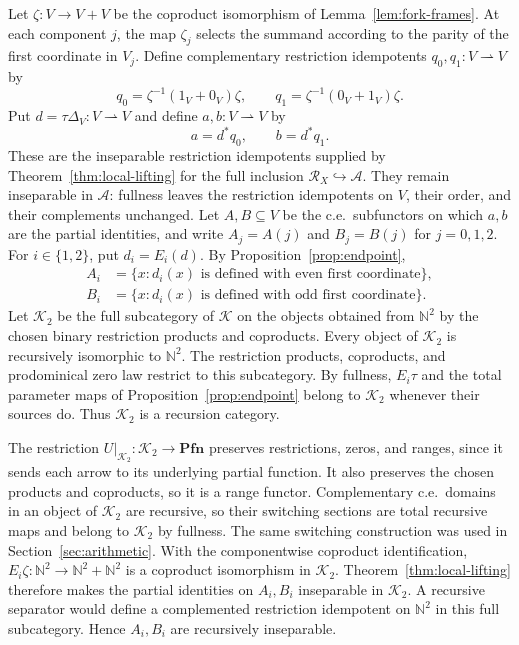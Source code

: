 \documentclass[11pt]{article}
\newcommand{\N}{\mathbb N}
\newcommand{\Pfn}{\mathbf{Pfn}}
\begin{document}
Let $\zeta:V\to V+V$ be the coproduct isomorphism of
Lemma~\ref{lem:fork-frames}. At each component $j$, the map
$\zeta_j$ selects the summand according to the parity of the
first coordinate in $V_j$. Define complementary restriction idempotents
$q_0,q_1:V\rightharpoonup V$ by
\[
 q_0=\zeta^{-1}(1_V+0_V)\zeta,\qquad
 q_1=\zeta^{-1}(0_V+1_V)\zeta.
\]
Put $d=\tau\Delta_V:V\rightharpoonup V$ and define
$a,b:V\rightharpoonup V$ by
\[
 a=d^*q_0,\qquad b=d^*q_1.
\]
These are the inseparable restriction idempotents supplied by
Theorem~\ref{thm:local-lifting} for the full inclusion
$\mathscr R_X\hookrightarrow\mathcal A$. They remain inseparable
in $\mathcal A$: fullness leaves the restriction idempotents on $V$, their order,
and their complements unchanged.
Let $A,B\subseteq V$ be the c.e.\ subfunctors on which $a,b$
are the partial identities, and write $A_j=A(j)$ and $B_j=B(j)$
for $j=0,1,2$. For $i\in\{1,2\}$, put $d_i=E_i(d)$.
By Proposition~\ref{prop:endpoint},
\begin{align*}
 A_i&=\{x:d_i(x)\text{ is defined with even first coordinate}\},\\
 B_i&=\{x:d_i(x)\text{ is defined with odd first coordinate}\}.
\end{align*}
Let $\mathcal K_2$ be the full subcategory of $\mathcal K$ on the
objects obtained from $\N^2$ by the chosen binary restriction
products and coproducts. Every object of $\mathcal K_2$ is recursively
isomorphic to $\N^2$. The restriction products, coproducts, and
prodominical zero law restrict to this subcategory. By fullness,
$E_i\tau$ and the total parameter maps of
Proposition~\ref{prop:endpoint} belong to $\mathcal K_2$ whenever
their sources do. Thus $\mathcal K_2$ is a recursion category.

The restriction $U|_{\mathcal K_2}:\mathcal K_2\to\Pfn$ preserves
restrictions, zeros, and ranges, since it sends each arrow to its
underlying partial function. It also preserves the chosen products
and coproducts, so it is a range functor.
Complementary c.e.\ domains in an object of $\mathcal K_2$ are recursive,
so their switching sections are total recursive maps and belong to
$\mathcal K_2$ by fullness. The same switching construction was used
in Section~\ref{sec:arithmetic}. With the componentwise coproduct
identification, $E_i\zeta:\N^2\to\N^2+\N^2$ is a coproduct
isomorphism in $\mathcal K_2$.
Theorem~\ref{thm:local-lifting} therefore makes the partial identities
on $A_i,B_i$ inseparable in $\mathcal K_2$. A recursive separator
would define a complemented restriction idempotent on $\N^2$ in
this full subcategory. Hence $A_i,B_i$ are recursively inseparable.
\end{document}
